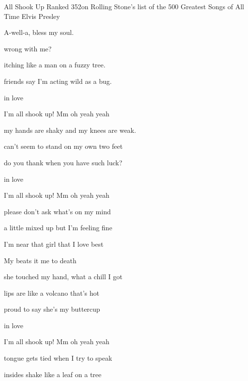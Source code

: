 \begin{SBSong}{All Shook Up}
  {Ranked 352\th on Rolling Stone's list of the 500 Greatest Songs of All Time}
  {Elvis Presley}
  \begin{SBVerse}
    A-well-a, bless my soul.

     wrong with me?

     itching like a man on a fuzzy tree.

     friends say I'm acting wild as a bug.

     in love 
	
    I'm all shook up! Mm oh  yeah  yeah
  \end{SBVerse}
  \begin{SBVerse}	    	 
     my hands are shaky and my knees are weak.

     can't seem to stand on my own two feet

     do you thank when you have such luck?

     in love 

    I'm all shook up! Mm oh  yeah  yeah
  \end{SBVerse}
  
  \begin{SBVerse}    	 
     please don't ask what's on my mind

     a little mixed up but I'm feeling fine

     I'm near that girl that I love best

    My   beats   it  me to death

     she touched my hand, what a chill I got

     lips are like a volcano that's hot

     proud to say she's my buttercup

     in love 

    I'm all shook up! Mm oh  yeah  yeah
  \end{SBVerse}
  \CBPageBrk
  \begin{SBVerse}
 	 tongue gets tied when I try to speak

 	 insides shake like a leaf on a tree


\end{SBVerse}
\end{SBSong}

